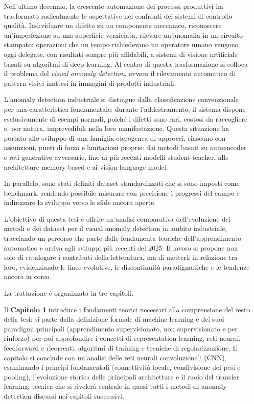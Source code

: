 Nell'ultimo decennio, la crescente automazione dei processi produttivi ha trasformato radicalmente le aspettative nei confronti dei sistemi di controllo qualità. Individuare un difetto su un componente meccanico, riconoscere un'imperfezione su una superficie verniciata, rilevare un'anomalia in un circuito stampato: operazioni che un tempo richiedevano un operatore umano vengono oggi delegate, con risultati sempre più affidabili, a sistemi di visione artificiale basati su algoritmi di deep learning. Al centro di questa trasformazione si colloca il problema del \textit{visual anomaly detection}, ovvero il rilevamento automatico di pattern visivi inattesi in immagini di prodotti industriali.

L'anomaly detection industriale si distingue dalla classificazione convenzionale per una caratteristica fondamentale: durante l'addestramento, il sistema dispone esclusivamente di esempi normali, poiché i difetti sono rari, costosi da raccogliere e, per natura, imprevedibili nella loro manifestazione. Questa situazione ha portato allo sviluppo di una famiglia eterogenea di approcci, ciascuno con assunzioni, punti di forza e limitazioni proprie: dai metodi basati su autoencoder e reti generative avversarie, fino ai più recenti modelli student-teacher, alle architetture memory-based e ai vision-language model. 

In parallelo, sono stati definiti dataset standardizzati che si sono imposti come benchmark, rendendo possibile misurare con precisione i progressi del campo e indirizzare lo sviluppo verso le sfide ancora aperte.

L'obiettivo di questa tesi è offrire un'analisi comparativa dell'evoluzione dei metodi e dei dataset per il visual anomaly detection in ambito industriale, tracciando un percorso che parte dalle fondamenta teoriche dell'apprendimento automatico e arriva agli sviluppi più recenti del 2025. Il lavoro si propone non solo di catalogare i contributi della letteratura, ma di metterli in relazione tra loro, evidenziando le linee evolutive, le discontinuità paradigmatiche e le tendenze ancora in corso.

La trattazione è organizzata in tre capitoli.

\medskip
\noindent Il \textbf{Capitolo 1} introduce i fondamenti teorici necessari alla comprensione del resto della tesi: si parte dalla definizione formale di machine learning e dei suoi paradigmi principali (apprendimento supervisionato, non supervisionato e per rinforzo) per poi approfondire i concetti di representation learning, reti neurali feedforward e ricorrenti, algoritmi di training e tecniche di regolarizzazione. Il capitolo si conclude con un'analisi delle reti neurali convoluzionali (CNN), esaminando i principi fondamentali (connettività locale, condivisione dei pesi e pooling), l'evoluzione storica delle principali architetture e il ruolo del transfer learning, tecnica che si rivelerà centrale in quasi tutti i metodi di anomaly detection discussi nei capitoli successivi.

